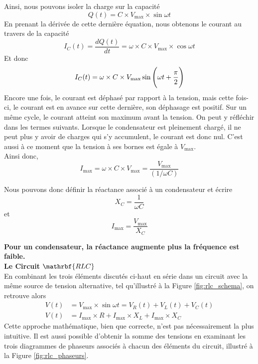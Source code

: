 \documentclass[titlepage,oneside,a4paper,11pt]{book} %
\begin{document}
Ainsi, nous pouvons isoler la charge sur la capacité
\begin{equation*}
    Q(t) = C\times V_{\mathrm{max}}\times \sin \omega t
\end{equation*}
En prenant la dérivée de cette dernière équation, nous obtenons le courant au travers de la capacité
\begin{equation*}
    I_C(t) = \frac{dQ(t)}{dt} = \omega\times C \times V_{\mathrm{max}}\times \cos \omega t
\end{equation*}
Et donc
\begin{equation*}
    I_C(t) = \omega \times C\times V_{\mathrm{max}}\sin \Bigg{(}\omega t + \frac{\pi}{2}\Bigg{)}
\end{equation*}
Encore une fois, le courant est déphasé par rapport à la tension, mais cette fois-ci, le courant est en avance sur cette dernière, son déphasage est positif. Sur un même cycle, le courant atteint son maximum avant la tension. On peut y réfléchir dans les termes suivants.  Lorsque le condensateur est pleinement chargé, il ne peut plus y avoir de charges qui s'y accumulent, le courant est donc nul.  C'est aussi à ce moment que la tension à ses bornes est égale à $V_{\mathrm{max}}$.\\

Ainsi donc,
\begin{equation*}
    I_{\mathrm{max}} = \omega \times C\times V_{\mathrm{max}} = \frac{V_{\mathrm{max}}}{(1/\omega C)}
\end{equation*}


Nous pouvons donc définir la réactance associé à un condensateur et écrire
\begin{equation}
    X_C = \frac{1}{\omega C}
\end{equation}
et
\begin{equation}
    I_{\mathrm{max}} = \frac{V_{\mathrm{max}}}{X_C}
    \label{eq:C_IV}
\end{equation}


\textbf{Pour un condensateur, la réactance augmente plus la fréquence est faible.}\\

{\Large \textbf{Le Circuit $\mathrbf{RLC}$}}\\

En combinant les trois éléments discutés ci-haut en série dans un circuit avec la même source de tension alternative, tel qu'illustré à la Figure \ref{fig:rlc_schema}, on retrouve alors
\begin{align*}
    V(t) &= V_{\mathrm{max}} \times \sin \omega t = V_R(t) + V_L(t) + V_C(t)\\
    V(t) &= I_{\mathrm{max}}\times R + I_{\mathrm{max}}\times X_L + I_{\mathrm{max}} \times X_C
\end{align*}
Cette approche mathématique, bien que correcte, n'est pas nécessairement la plus intuitive. Il est aussi possible d'obtenir la somme des tensions en examinant les trois diagrammes de phaseurs associés à chacun des éléments du circuit, illustré à la Figure \ref{fig:rlc_phaseurs}. \\
\end{document}
